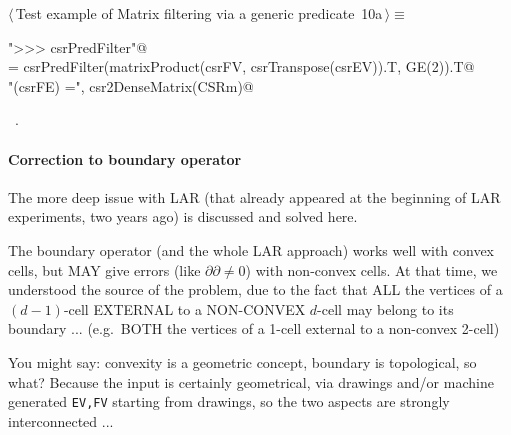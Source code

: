 \documentclass[11pt,oneside]{article}    %
\begin{document}
\begin{flushleft} \small \label{scrap17}
\protect{}$\langle\,$Test example of Matrix filtering via a generic predicate\nobreak\ {\footnotesize 10a}$\,\rangle\equiv$
\vspace{-1ex}
\begin{list}{}{} \item
\mbox{}\verb@print "\n>>> csrPredFilter"@\\
\mbox{}\verb@CSRm = csrPredFilter(matrixProduct(csrFV, csrTranspose(csrEV)).T, GE(2)).T@\\
\mbox{}\verb@print "\nccsrPredFilter(csrFE) =\n", csr2DenseMatrix(CSRm)@\\
\mbox{}\verb@@{\NWsep}
\end{list}
\vspace{-1ex}
\footnotesize\addtolength{\baselineskip}{-1ex}
\begin{list}{}{\setlength{\itemsep}{-\parsep}\setlength{\itemindent}{-\leftmargin}}
\item \NWtxtMacroRefIn\ .
\end{list}
\end{flushleft}

\paragraph{Correction to boundary operator}
The more deep issue with LAR (that already appeared at the beginning of LAR experiments, two years ago) is discussed and solved here.

The boundary operator (and the whole LAR approach) works well with convex cells, but MAY give errors (like $\partial\partial \not= 0$) with non-convex cells. At that time, we understood the source of the problem, due to the fact that ALL the vertices of a $(d-1)$-cell  EXTERNAL to a NON-CONVEX $d$-cell may belong to its boundary ... (e.g.~BOTH the vertices of a 1-cell external to a non-convex 2-cell)

You might say: convexity is a geometric concept, boundary is topological, so what? 
Because the input is certainly geometrical, via drawings and/or machine generated \texttt{EV,FV} starting from drawings, so the two aspects are strongly interconnected ... 
\end{document}
